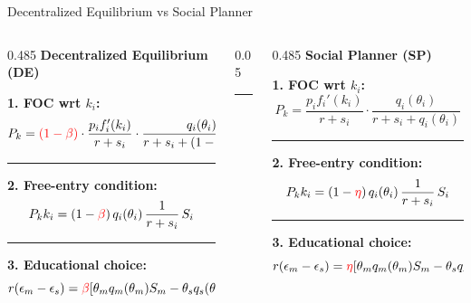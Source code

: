 \documentclass[9pt,xcolor={svgnames}]{beamer}
\begin{document}
\begin{frame}{Decentralized Equilibrium vs Social Planner}
\small
\vspace{2mm}
\begin{columns}[T,onlytextwidth]
\begin{column}{0.485\textwidth}
\textbf{Decentralized Equilibrium (DE)}
\vspace{0.3em}

\textbf{1. FOC wrt $k_i$:}
\[
P_k =\textcolor{red}{ (1-\beta)}\cdot
\frac{p_i f_i'(k_i)}{r+s_i}\cdot
\frac{q_i(\theta_i)}{r+s_i+(1-\beta)q_i(\theta_i)}
\]

\vspace{-0.3em}\hrule\vspace{0.6em}

\textbf{2. Free-entry condition:}
\[
P_k k_i = (1-\textcolor{red}{\beta})\, q_i(\theta_i)\,\frac{1}{r+s_i}\, S_i
\]

\vspace{-0.3em}\hrule\vspace{0.6em}

\textbf{3. Educational choice:}
\[
r(\epsilon_m-\epsilon_s)=\textcolor{red}{\beta}[\theta_m q_m(\theta_m) S_m
-\theta_s q_s(\theta_s) S_s]
\]
\end{column}

\begin{column}{0.05\textwidth}
\centering
\rule{0.4pt}{0.5\textheight}
\end{column}

\begin{column}{0.485\textwidth}
\textbf{Social Planner (SP)}
\vspace{0.3em}

\textbf{1. FOC wrt $k_i$:}
\[
P_k = 
\frac{p_i f_i'(k_i)}{r+s_i}\cdot
\frac{q_i(\theta_i)}{r+s_i+q_i(\theta_i)}
\]

\vspace{-0.3em}\hrule\vspace{0.6em}

\textbf{2. Free-entry condition:}
\[
P_k k_i = (1-\textcolor{red}{\eta})\, q_i(\theta_i)\,\frac{1}{r+s_i}\, S_i
\]

\vspace{-0.3em}\hrule\vspace{0.6em}

\textbf{3. Educational choice:}
\[
r(\epsilon_m-\epsilon_s)=\textcolor{red}{\eta}[\theta_m q_m(\theta_m) S_m
-\theta_s q_s(\theta_s) S_s]
\]


\end{column}
\end{columns}
\end{frame}
\end{document}
